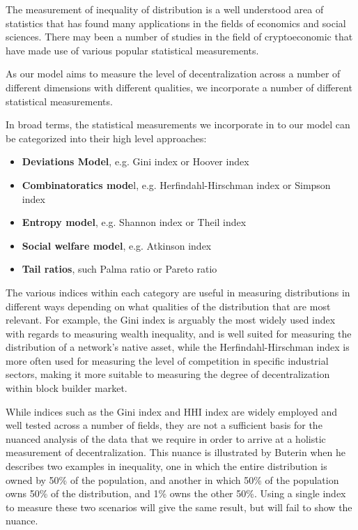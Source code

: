 \documentclass[conference]{IEEEtran}
\begin{document}
The measurement of inequality of distribution is a well understood area of statistics that has found many applications in the fields of economics and social sciences. There may been a number of studies in the field of cryptoeconomic that have made use of various popular statistical measurements.

As our model aims to measure the level of decentralization across a number of different dimensions with different qualities, we incorporate a number of different statistical measurements.

In broad terms, the statistical measurements we incorporate in to our model can be categorized into their high level approaches:

\begin{itemize}
    \item \textbf{Deviations Model}, e.g. Gini index or Hoover index
    \item \textbf{Combinatoratics mode}l, e.g. Herfindahl-Hirschman index or Simpson index
    \item \textbf{Entropy model}, e.g. Shannon index or Theil index
    \item \textbf{Social welfare model}, e.g. Atkinson index
    \item \textbf{Tail ratios}, such Palma ratio or Pareto ratio
\end{itemize}

The various indices within each category are useful in measuring distributions in different ways depending on what qualities of the distribution that are most relevant.  For example, the Gini index is arguably the most widely used index with regards to measuring wealth inequality, and is well suited for measuring the distribution of a network's native asset, while the Herfindahl-Hirschman index is more often used for measuring the level of competition in specific industrial sectors, making it more suitable to measuring the degree of decentralization within block builder market.

While indices such as the Gini index and HHI index are widely employed and well tested across a number of fields, they are not a sufficient basis for the nuanced analysis of the data that we require in order to arrive at a holistic measurement of decentralization.  This nuance is illustrated by Buterin \cite{buterin2022b} when he describes two examples in inequality, one in which the entire distribution is owned by 50\% of the population, and another in which 50\% of the population owns 50\% of the distribution, and 1\% owns the other 50\%.  Using a single index to measure these two scenarios will give the same result, but will fail to show the nuance.
\end{document}
